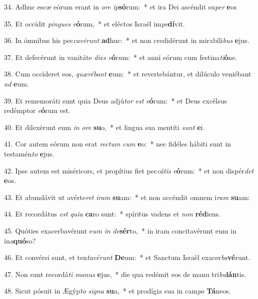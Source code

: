 34. Adhuc escæ eórum erant in \textit{o}\textit{re} \textit{ip}\textbf{só}rum:~*  et ira Dei ascéndit su\textit{per} \textbf{e}os\

35. Et occídit \textit{pin}\textit{gues} \textit{e}\textbf{ó}rum,~*  et eléctos Israël im\textit{pe}\textbf{dí}vit.\

36. In ómnibus his pec\textit{ca}\textit{vé}\textit{runt} \textbf{ad}huc:~*  et non credidérunt in mirabíli\textit{bus} \textbf{e}jus.\

37. Et defecérunt in vanitáte \textit{di}\textit{es} \textit{e}\textbf{ó}rum:~*  et anni eórum cum festina\textit{ti}\textbf{ó}ne.\

38. Cum occíderet eos, \textit{quæ}\textit{ré}\textit{bant} \textbf{e}um:~*  et revertebántur, et dilúculo veniébant \textit{ad} \textbf{e}um.\

39. Et rememoráti sunt quia Deus adjú\textit{tor} \textit{est} \textit{e}\textbf{ó}rum:~*  et Deus excélsus redémptor \textit{e}\textbf{ó}rum est.\

40. Et dilexérunt eum \textit{in} \textit{o}\textit{re} \textbf{su}o,~*  et lingua sua mentíti \textit{sunt} \textbf{e}i.\

41. Cor autem eórum non erat \textit{rec}\textit{tum} \textit{cum} \textbf{e}o:~*  nec fidéles hábiti sunt in testamén\textit{to} \textbf{e}jus.\

42. Ipse autem est miséricors, et propítius fiet pec\textit{cá}\textit{tis} \textit{e}\textbf{ó}rum:~*  et non dispér\textit{det} \textbf{e}os.\

43. Et abundávit ut avérte\textit{ret} \textit{i}\textit{ram} \textbf{su}am:~*  et non accéndit omnem i\textit{ram} \textbf{su}am:\

44. Et recordátus \textit{est} \textit{qui}\textit{a} \textbf{ca}ro sunt:~*  spíritus vadens et \textit{non} \textbf{réd}iens.\

45. Quóties exacerbavérunt e\textit{um} \textit{in} \textit{de}\textbf{sér}to,~*  in iram concitavérunt eum in in\textit{a}\textbf{quó}so?\

46. Et convérsi sunt, et ten\textit{ta}\textit{vé}\textit{runt} \textbf{De}um:~*  et Sanctum Israël exacer\textit{ba}\textbf{vé}runt.\

47. Non sunt recordá\textit{ti} \textit{ma}\textit{nus} \textbf{e}jus,~*  die qua redémit eos de manu tri\textit{bu}\textbf{lán}tis.\

48. Sicut pósuit in Ægýp\textit{to} \textit{si}\textit{gna} \textbf{su}a,~*  et prodígia sua in cam\textit{po} \textbf{Tá}neos.\

